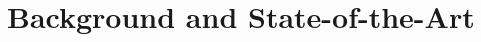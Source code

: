 \documentclass[fleqn,12pt]{article}
\begin{document}



\section{Background and State-of-the-Art}
\label{sec:background}


\end{document}
